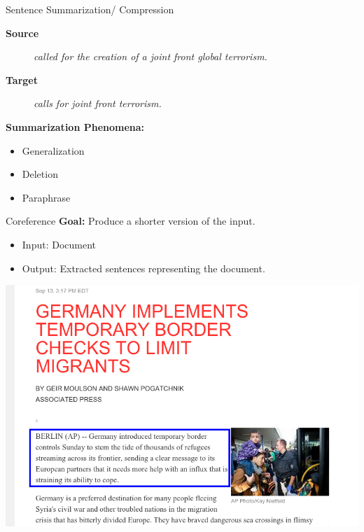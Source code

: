 \documentclass{beamer}
\begin{document}
\begin{frame}{Sentence Summarization/ Compression}
  \begin{center}
    \textbf{Source}
  \end{center}
    
  \begin{figure}
    \textit{
      called  for the creation of
      a joint front  global terrorism. }
  \end{figure}

  \begin{center}
    \textbf{Target}
  \end{center}

  \begin{figure}
    \centering
    \textit{ calls for joint
      front  terrorism.}
  \end{figure}

\air
\air

\textbf{Summarization Phenomena:} 

\begin{itemize}
\item<2-> \alert<2>{Generalization}
\item<3-> \alert<3>{Deletion}
\item<4-> \alert<4>{Paraphrase}
\end{itemize}
\end{frame}

\begin{frame}{Coreference}
  \textbf{Goal:} Produce a shorter version of the input.

  \begin{itemize}
  \item Input: Document
  \item Output: Extracted sentences representing the document.
  \end{itemize}  
\end{frame}


\begin{frame}
  \includegraphics[width=\linewidth]{ap}
\end{frame}


{

}
\end{document}
